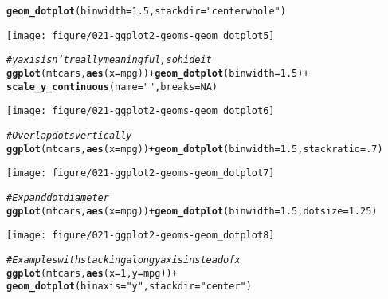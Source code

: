 \documentclass[a4paper,titlepage]{tufte-handout}\usepackage[]{graphicx}\usepackage[]{color}
\makeatletter
\def\maxwidth{ %
  \ifdim\Gin@nat@width>\linewidth
    \linewidth
  \else
    \Gin@nat@width
  \fi
}
\newcommand{\hlnum}[1]{\textcolor[rgb]{0.686,0.059,0.569}{#1}}%
\newcommand{\hlstr}[1]{\textcolor[rgb]{0.192,0.494,0.8}{#1}}%
\newcommand{\hlcom}[1]{\textcolor[rgb]{0.678,0.584,0.686}{\textit{#1}}}%
\newcommand{\hlopt}[1]{\textcolor[rgb]{0,0,0}{#1}}%
\newcommand{\hlstd}[1]{\textcolor[rgb]{0.345,0.345,0.345}{#1}}%
\newcommand{\hlkwc}[1]{\textcolor[rgb]{0.333,0.667,0.333}{#1}}%
\newcommand{\hlkwd}[1]{\textcolor[rgb]{0.737,0.353,0.396}{\textbf{#1}}}%
\newenvironment{kframe}{%
 \def\at@end@of@kframe{}%
 \ifinner\ifhmode%
  \def\at@end@of@kframe{\end{minipage}}%
  \begin{minipage}{\columnwidth}%
 \fi\fi%
 \def\FrameCommand##1{\hskip\@totalleftmargin \hskip-\fboxsep
 \colorbox{shadecolor}{##1}\hskip-\fboxsep
     \hskip-\linewidth \hskip-\@totalleftmargin \hskip\columnwidth}%
 \MakeFramed {\advance\hsize-\width
   \@totalleftmargin\z@ \linewidth\hsize
   \@setminipage}}%
 {\par\unskip\endMakeFramed%
 \at@end@of@kframe}
\newenvironment{knitrout}{}{} %
\makeatother
\begin{document}
\begin{knitrout}
\begin{kframe}
\begin{alltt}
  \hlkwd{geom_dotplot}\hlstd{(}\hlkwc{binwidth} \hlstd{=} \hlnum{1.5}\hlstd{,} \hlkwc{stackdir} \hlstd{=} \hlstr{"centerwhole"}\hlstd{)}
\end{alltt}
\end{kframe}
\texttt{[image: figure/021-ggplot2-geoms-geom\_dotplot5]} 
\begin{kframe}\begin{alltt}
\hlcom{# y axis isn't really meaningful, so hide it}
\hlkwd{ggplot}\hlstd{(mtcars,} \hlkwd{aes}\hlstd{(}\hlkwc{x} \hlstd{= mpg))} \hlopt{+} \hlkwd{geom_dotplot}\hlstd{(}\hlkwc{binwidth} \hlstd{=} \hlnum{1.5}\hlstd{)} \hlopt{+}
  \hlkwd{scale_y_continuous}\hlstd{(}\hlkwc{name} \hlstd{=} \hlstr{""}\hlstd{,} \hlkwc{breaks} \hlstd{=} \hlnum{NA}\hlstd{)}
\end{alltt}


{\ttfamily\noindent\color{warningcolor}{\#\# Warning: breaks = NA is deprecated. Please use breaks = NULL to remove breaks in the scale. (Deprecated; last used in version 0.8.9)}}\end{kframe}
\texttt{[image: figure/021-ggplot2-geoms-geom\_dotplot6]} 
\begin{kframe}\begin{alltt}
\hlcom{# Overlap dots vertically}
\hlkwd{ggplot}\hlstd{(mtcars,} \hlkwd{aes}\hlstd{(}\hlkwc{x} \hlstd{= mpg))} \hlopt{+} \hlkwd{geom_dotplot}\hlstd{(}\hlkwc{binwidth} \hlstd{=} \hlnum{1.5}\hlstd{,} \hlkwc{stackratio} \hlstd{=} \hlnum{.7}\hlstd{)}
\end{alltt}
\end{kframe}
\texttt{[image: figure/021-ggplot2-geoms-geom\_dotplot7]} 
\begin{kframe}\begin{alltt}
\hlcom{# Expand dot diameter}
\hlkwd{ggplot}\hlstd{(mtcars,} \hlkwd{aes}\hlstd{(}\hlkwc{x}  \hlstd{=mpg))} \hlopt{+} \hlkwd{geom_dotplot}\hlstd{(}\hlkwc{binwidth} \hlstd{=} \hlnum{1.5}\hlstd{,} \hlkwc{dotsize} \hlstd{=} \hlnum{1.25}\hlstd{)}
\end{alltt}
\end{kframe}
\texttt{[image: figure/021-ggplot2-geoms-geom\_dotplot8]} 
\begin{kframe}\begin{alltt}
\hlcom{# Examples with stacking along y axis instead of x}
\hlkwd{ggplot}\hlstd{(mtcars,} \hlkwd{aes}\hlstd{(}\hlkwc{x} \hlstd{=} \hlnum{1}\hlstd{,} \hlkwc{y} \hlstd{= mpg))} \hlopt{+}
  \hlkwd{geom_dotplot}\hlstd{(}\hlkwc{binaxis} \hlstd{=} \hlstr{"y"}\hlstd{,} \hlkwc{stackdir} \hlstd{=} \hlstr{"center"}\hlstd{)}
\end{alltt}



\end{kframe}
\end{knitrout}
\end{document}
